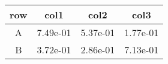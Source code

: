 \begin{tabular}{cccc}
\toprule
row&col1&col2&col3\tabularnewline
\midrule
A&7.49e-01&5.37e-01&1.77e-01\tabularnewline
B&3.72e-01&2.86e-01&7.13e-01\tabularnewline
\bottomrule
\end{tabular}
